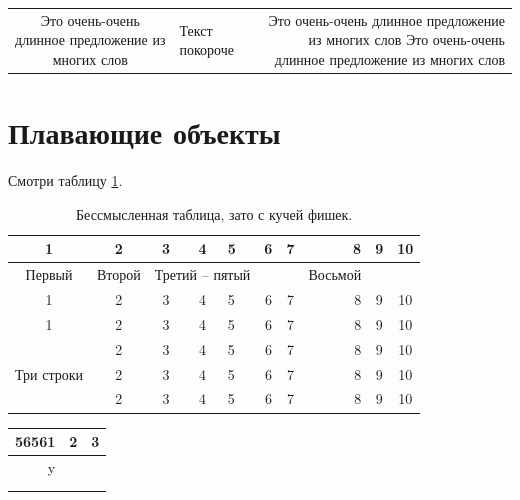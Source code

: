 \documentclass[a4paper,12pt]{article}
\begin{document}
\begin{tabulary}{\textwidth}{C|J|R}
	\hline
	Это очень-очень длинное предложение из многих слов & Текст покороче & Это очень-очень длинное предложение из многих слов Это очень-очень длинное предложение из многих слов
\end{tabulary}

\section{Плавающие объекты}

Смотри таблицу \ref{tab:mytab}.

\begin{table}[!h]
	\begin{center}
		\caption[Заголовок для списка таблиц]{Бессмысленная таблица, зато с кучей фишек.}\label{tab:mytab}
		\begin{tabular}{|c|c|c|c||l|c|c|r|c|c|}
  		\hline
    	1 & 2 & 3 & 4 & 5 & 6 & 7 & 8 & 9 & 10 \\ \hline
  		Первый & Второй & \multicolumn{3}{|c|}{Третий -- пятый} &   &  & Восьмой &   &  \\ 
		\cline{1-7} \cline{9-10}
   		1 & 2 & 3 & 4 & 5 & 6 & 7 & 8 & 9 & 10 \\ \hline \hline
   		1 & 2 & 3 & 4 & 5 & 6 & 7 & 8 & 9 & 10 \\ \hline
    	\multirow{3}{*}{Три строки}  & 2 & 3 & 4 & 5 & 6 & 7 & 8 & 9 & 10 \\ \cline{2-10}
    	  & 2 & 3 & 4 & 5 & 6 & 7 & 8 & 9 & 10 \\ \cline{2-10}
    	  & 2 & 3 & 4 & 5 & 6 & 7 & 8 & 9 & 10 \\ \hline
		\end{tabular}
	\end{center}
\end{table}



\begin{tabular}{|r|c|c|}
	\hline
	56561 & 2 & 3\\
	\hline
	y& &  \\
	\hline
	& & \\
	\hline
	& & \\
	\hline
\end{tabular}
\end{document}
